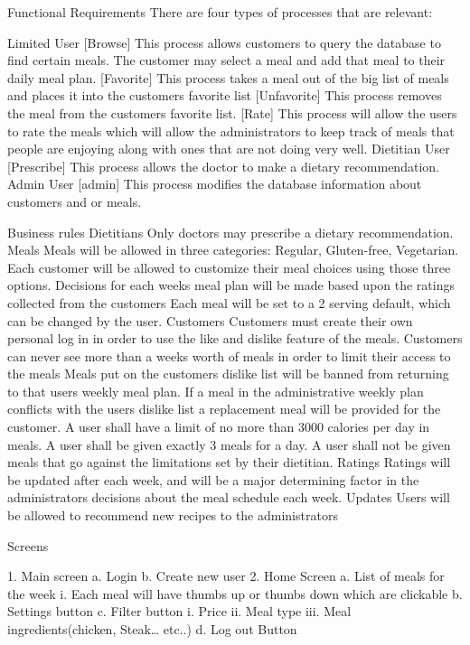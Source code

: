 \documentclass[a4paper,10pt]{article}
\begin{document}
\begin{mySubsection}{Functional Requirements}
There are four types of processes that are relevant:

Limited User
[Browse] This process allows customers to query the database to find certain meals. The customer may select a meal and add that meal to their daily meal plan.
[Favorite] This process takes a meal out of the big list of meals and places it into the customers favorite list
[Unfavorite] This process removes the meal from the customers favorite list.
[Rate] This process will allow the users to rate the meals which will allow the administrators to keep track of meals that people are enjoying along with ones that are not doing very well.
Dietitian User
[Prescribe] This process allows the doctor to make a dietary recommendation.
Admin User
[admin] This process modifies the database information about customers and or meals.
\end{mySubsection}
\begin{mySubsection}{Business rules}
Dietitians
Only doctors may prescribe a dietary recommendation.
Meals
Meals will be  allowed in three categories: Regular, Gluten-free, Vegetarian. 
Each customer will be allowed to customize their meal choices using those three options. 
Decisions for each weeks meal plan will be made based upon the ratings collected from the customers
Each meal will be set to a 2 serving default, which can be changed by the user.
Customers
Customers must create their own personal log in in order to use the like and dislike feature of the meals.
Customers can never see more than a weeks worth of meals in order to limit their access to the meals
Meals put on the customers dislike list will be banned from returning to that users weekly meal plan. If a meal in the administrative weekly plan conflicts with the users dislike list a replacement meal will be provided for the customer. 
A user shall have a limit of no more than 3000 calories per day in meals.
A user shall be given exactly 3 meals for a day.
A user shall not be given meals that go against the limitations set by their dietitian.
Ratings
Ratings will be updated after each week, and will be a major determining factor in the administrators decisions about the meal schedule each week.
Updates
Users will be allowed to recommend new recipes to the administrators 
\end{mySubsection}
 
 
\begin{mySubsection}{Screens}
 
1.     Main screen
a.    Login
b.    Create new user
2.     Home Screen
a.    List of meals for the week
                                              i. 	Each meal will have thumbs up or thumbs down which are clickable
b.    Settings button
c.     Filter button
                                              i. 	Price
                                            ii. 	Meal type
                                          iii. 	Meal ingredients(chicken, Steak… etc..)
d.    Log out Button
\end{mySubsection}
\end{document}
